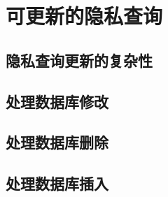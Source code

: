\section{可更新的隐私查询}

\subsection{隐私查询更新的复杂性}

\subsection{处理数据库修改}

\subsection{处理数据库删除}

\subsection{处理数据库插入}